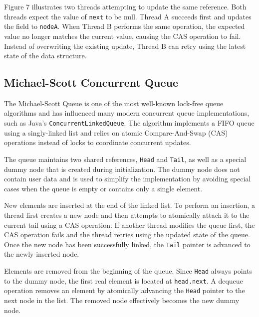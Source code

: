Figure 7 illustrates two threads attempting to update the same reference. Both threads expect the value of \texttt{next} to be null. Thread A succeeds first and updates the field to \texttt{nodeA}. When Thread B performs the same operation, the expected value no longer matches the current value, causing the CAS operation to fail. Instead of overwriting the existing update, Thread B can retry using the latest state of the data structure.

\subsection{Michael-Scott Concurrent Queue}
The Michael-Scott Queue is one of the most well-known lock-free queue algorithms and has influenced many modern concurrent queue implementations, such as Java's \texttt{ConcurrentLinkedQueue}. The algorithm implements a FIFO queue using a singly-linked list and relies on atomic Compare-And-Swap (CAS) operations instead of locks to coordinate concurrent updates.

The queue maintains two shared references, \texttt{Head} and \texttt{Tail}, as well as a special dummy node that is created during initialization. The dummy node does not contain user data and is used to simplify the implementation by avoiding special cases when the queue is empty or contains only a single element. \cite{michael-scott-queue}


New elements are inserted at the end of the linked list. To perform an insertion, a thread first creates a new node and then attempts to atomically attach it to the current tail using a CAS operation. If another thread modifies the queue first, the CAS operation fails and the thread retries using the updated state of the queue. Once the new node has been successfully linked, the \texttt{Tail} pointer is advanced to the newly inserted node. \cite{michael-scott-queue}


Elements are removed from the beginning of the queue. Since \texttt{Head} always points to the dummy node, the first real element is located at \texttt{head.next}. A dequeue operation removes an element by atomically advancing the \texttt{Head} pointer to the next node in the list. The removed node effectively becomes the new dummy node. \cite{michael-scott-queue}

